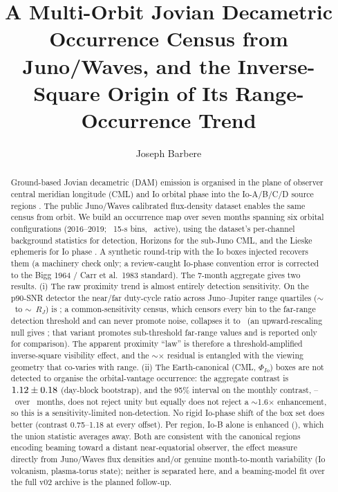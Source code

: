 \documentclass[twocolumn]{aastex631}
\begin{document}
\title{A Multi-Orbit Jovian Decametric Occurrence Census from Juno/Waves, and the
Inverse-Square Origin of Its Range-Occurrence Trend}
\author[0009-0008-3289-4447]{Joseph Barbere}

\begin{abstract}
Ground-based Jovian decametric (DAM) emission is organised in the plane of observer
central meridian longitude (CML) and Io orbital phase into the Io-A/B/C/D source regions
\citep{bigg1964,carr1983,marques2017}. The public Juno/Waves calibrated flux-density dataset
\citep{louis2021} enables the same census from orbit. We build an occurrence map over seven
months spanning six orbital configurations (2016--2019; \jdRealNbins\ 15-s bins, \jdRealNact\
active), using the dataset's per-channel background statistics for detection, Horizons for the
sub-Juno CML, and the Lieske ephemeris for Io phase \citep{lieske1987}. A synthetic round-trip
with the Io boxes injected recovers them (a machinery check only; a review-caught Io-phase
convention error is corrected to the Bigg 1964 / Carr et al.\ 1983 standard). The 7-month
aggregate gives two results. (i) The raw proximity trend is almost entirely detection
sensitivity. On the p90-SNR detector the near/far duty-cycle ratio across Juno--Jupiter range
quartiles ($\sim$\jdRangeNear\ to $\sim$\jdRangeFar~$R_J$) is \jdNearFarRawPninety; a
common-sensitivity census, which censors every bin to the far-range detection threshold and can
never promote noise, collapses it to \jdNearFarCens\ (an upward-rescaling null gives
\jdNearFarCorr; that variant promotes sub-threshold far-range values and is reported only for
comparison). The apparent proximity ``law'' is therefore a threshold-amplified inverse-square
visibility effect, and the $\sim$\jdNearFarCens$\times$ residual is entangled with the viewing
geometry that co-varies with range. (ii) The
Earth-canonical (CML, $\Phi_{Io}$) boxes are not detected to organise the orbital-vantage
occurrence: the aggregate contrast is $1.12\pm0.18$ (day-block bootstrap),
and the 95\% interval on the monthly contrast, \jdMonthCIlo--\jdMonthCIhi\ over \jdNmonths\
months, does not reject unity but equally does not reject a $\sim$1.6$\times$ enhancement, so
this is a sensitivity-limited non-detection. No rigid Io-phase shift of the box set does better
(contrast 0.75--1.18 at every offset). Per region, Io-B alone is enhanced (\jdRegB), which the
union statistic averages away. Both are consistent with the canonical regions encoding beaming toward a distant
near-equatorial observer, the effect \citet{louis2021jgr} measure directly from Juno/Waves
flux densities and/or genuine month-to-month variability (Io volcanism, plasma-torus
state); neither is separated here, and a beaming-model fit over the full v02 archive is the
planned follow-up.
\end{abstract}
\end{document}
